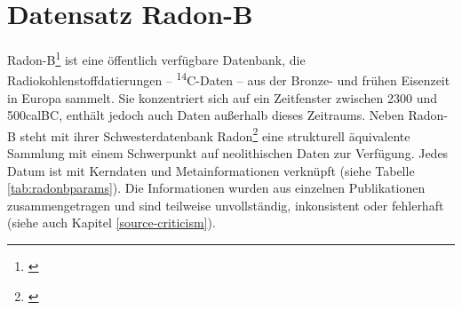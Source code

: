 \documentclass[openany,twoside,twocolumn]{book}
\let\rmarkdownfootnote\footnote%
\def\footnote{\protect\rmarkdownfootnote}
\begin{document}
\hypertarget{radonb-dataset}{%
\section{Datensatz Radon-B}\label{radonb-dataset}}

Radon-B\footnote{\textcite{kneisel_radon-b_2013}} ist eine öffentlich
verfügbare Datenbank, die Radiokohlenstoffdatierungen --
\textsuperscript{14}C-Daten -- aus der Bronze- und frühen Eisenzeit in
Europa sammelt. Sie konzentriert sich auf ein Zeitfenster zwischen 2300
und 500calBC, enthält jedoch auch Daten außerhalb dieses Zeitraums.
Neben Radon-B steht mit ihrer Schwesterdatenbank Radon\footnote{\textcite{martin_hinz_radon_2012}}
eine strukturell äquivalente Sammlung mit einem Schwerpunkt auf
neolithischen Daten zur Verfügung. Jedes Datum ist mit Kerndaten und
Metainformationen verknüpft (siehe Tabelle \ref{tab:radonbparams}). Die
Informationen wurden aus einzelnen Publikationen zusammengetragen und
sind teilweise unvollständig, inkonsistent oder fehlerhaft (siehe auch
Kapitel \ref{source-criticism}).
\end{document}
